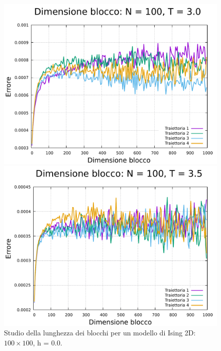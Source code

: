 \begin{figure}[H]
    \begin{minipage}{0.45\textwidth}  
      \centering
      \includegraphics[page=1, width=\textwidth]{Immagini/simIsing2D/metro/lblk/err_100_3.0.pdf}
      \caption{$T\,=\,3.0$}
    \end{minipage}\hfill
    \begin{minipage}{0.45\textwidth}  
      \centering
      \includegraphics[page=1, width=\textwidth]{Immagini/simIsing2D/metro/lblk/err_100_3.5.pdf}
      \caption{$T\,=\,3.5$}
    \end{minipage}
    \caption{Studio della lunghezza dei blocchi per un modello di Ising 2D: $100 \times 100$, h = 0.0.}
\end{figure}

